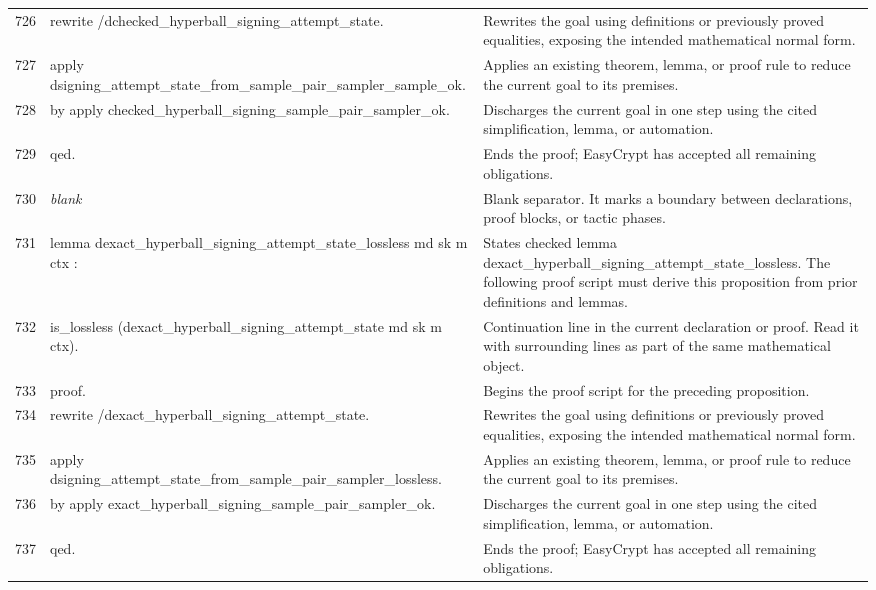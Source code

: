 \documentclass[10pt]{article}
\begin{document}
\begin{longtable}{r L{0.53\textwidth} L{0.37\textwidth}}
726 & {\ttfamily\scriptsize rewrite /dchecked\_hyperball\_signing\_attempt\_state.} & Rewrites the goal using definitions or previously proved equalities, exposing the intended mathematical normal form. \\
727 & {\ttfamily\scriptsize apply dsigning\_attempt\_state\_from\_sample\_pair\_sampler\_sample\_ok.} & Applies an existing theorem, lemma, or proof rule to reduce the current goal to its premises. \\
728 & {\ttfamily\scriptsize by apply checked\_hyperball\_signing\_sample\_pair\_sampler\_ok.} & Discharges the current goal in one step using the cited simplification, lemma, or automation. \\
729 & {\ttfamily\scriptsize qed.} & Ends the proof; EasyCrypt has accepted all remaining obligations. \\
730 & {\ttfamily\scriptsize \emph{blank}} & Blank separator.  It marks a boundary between declarations, proof blocks, or tactic phases. \\
731 & {\ttfamily\scriptsize lemma dexact\_hyperball\_signing\_attempt\_state\_lossless md sk m ctx :} & States checked lemma dexact\_hyperball\_signing\_attempt\_state\_lossless.  The following proof script must derive this proposition from prior definitions and lemmas. \\
732 & {\ttfamily\scriptsize   is\_lossless (dexact\_hyperball\_signing\_attempt\_state md sk m ctx).} & Continuation line in the current declaration or proof.  Read it with surrounding lines as part of the same mathematical object. \\
733 & {\ttfamily\scriptsize proof.} & Begins the proof script for the preceding proposition. \\
734 & {\ttfamily\scriptsize rewrite /dexact\_hyperball\_signing\_attempt\_state.} & Rewrites the goal using definitions or previously proved equalities, exposing the intended mathematical normal form. \\
735 & {\ttfamily\scriptsize apply dsigning\_attempt\_state\_from\_sample\_pair\_sampler\_lossless.} & Applies an existing theorem, lemma, or proof rule to reduce the current goal to its premises. \\
736 & {\ttfamily\scriptsize by apply exact\_hyperball\_signing\_sample\_pair\_sampler\_ok.} & Discharges the current goal in one step using the cited simplification, lemma, or automation. \\
737 & {\ttfamily\scriptsize qed.} & Ends the proof; EasyCrypt has accepted all remaining obligations. \\

\end{longtable}
\end{document}
